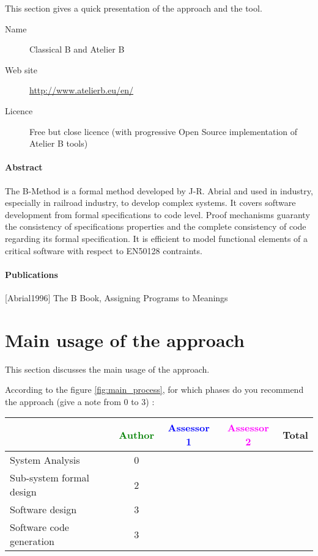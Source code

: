 This section gives a quick presentation of the approach and the tool.

\begin{description}
\item[Name] Classical B and Atelier B
\item[Web site] \url{http://www.atelierb.eu/en/}
\item[Licence] Free but close licence (with progressive Open Source implementation of Atelier B tools)
\end{description}

\paragraph{Abstract} The B-Method is a formal method developed by J-R. Abrial and used in industry, especially in railroad industry, to develop complex systems. It covers software development from formal specifications to code level. Proof mechanisms guaranty the consistency of specifications properties and the complete consistency of code regarding its formal specification. It is efficient to model  functional  elements of a critical software with respect to  EN50128 contraints.

\paragraph{Publications} 
[Abrial1996] The B Book, Assigning Programs to Meanings


\section{Main usage of the approach}
\label{main_usage}
This section discusses the main usage of the approach.

According to the figure \ref{fig:main_process}, for which phases do you recommend the approach (give a note from 0 to  3) :

\begin{tabular}{|l | c | c | c | c|}
\hline
& \textcolor{green}{Author} & \textcolor{blue}{Assessor 1} & \textcolor{magenta}{Assessor 2} & Total \\
\hline 
System Analysis & 0 & & &  \\
\hline
Sub-system formal design & 2 & & & \\
\hline
Software design & 3 & & & \\
\hline
Software code generation & 3 & & & \\
\hline
\end{tabular}

